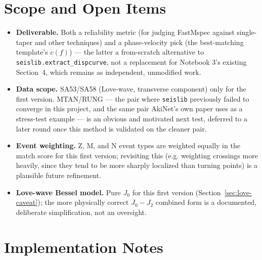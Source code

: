 \documentclass[11pt]{article}
\begin{document}
\section{Scope and Open Items}

\begin{itemize}[nosep]
  \item \textbf{Deliverable.} Both a reliability metric (for judging FastMspec against
    single-taper and other techniques) and a phase-velocity pick (the best-matching template's
    $c(f)$) --- the latter a from-scratch alternative to \texttt{seislib.extract\_dispcurve}, not
    a replacement for Notebook 3's existing Section~4, which remains as independent, unmodified
    work.
  \item \textbf{Data scope.} SA53/SA58 (Love-wave, transverse component) only for the first
    version. MTAN/RUNG --- the pair where \texttt{seislib} previously failed to converge in this
    project, and the same pair AkiNet's own paper uses as a stress-test example --- is an obvious
    and motivated next test, deferred to a later round once this method is validated on the
    cleaner pair.
  \item \textbf{Event weighting.} Z, M, and N event types are weighted equally in the match score
    for this first version; revisiting this (e.g. weighting crossings more heavily, since they
    tend to be more sharply localized than turning points) is a plausible future refinement.
  \item \textbf{Love-wave Bessel model.} Pure $J_0$ for this first version
    (Section~\ref{sec:love-caveat}); the more physically correct $J_0 - J_2$ combined form is a
    documented, deliberate simplification, not an oversight.
\end{itemize}

\section{Implementation Notes}
\label{sec:verification}
\end{document}
